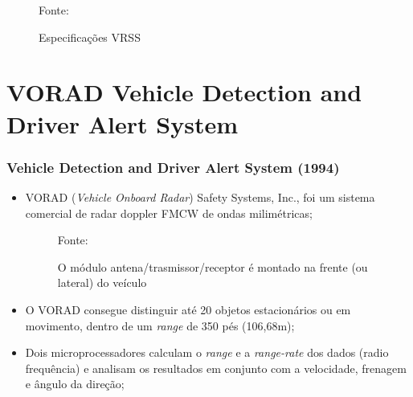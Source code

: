 \documentclass[xcolor=dvipsnames, aspectratio=169]{beamer}
\begin{document}
\begin{frame}
\begin{itemize}
\begin{figure}
            {Fonte: \cite{everett1995sensors}}
            \caption{Especificações VRSS}
            \label{fig:curva_de_freq}
        \end{figure}
	\end{itemize}
\end{frame}


\section[VORAD Vehicle Detection and Driver Alert System]{VORAD Vehicle Detection and Driver Alert System} 

\begin{frame}
\frametitle{Vehicle Detection and Driver Alert System (1994)}
	\begin{itemize}
		\item VORAD (\textit{Vehicle Onboard Radar}) Safety Systems, Inc., foi um sistema comercial de radar doppler FMCW de ondas milimétricas;
        \begin{figure}
            \centering
            {Fonte: \cite{everett1995sensors}}
            \caption{O módulo antena/trasmissor/receptor é montado na frente (ou lateral) do veículo}
            \label{fig:curva_de_freq}
        \end{figure}
		\item O VORAD consegue distinguir até 20 objetos estacionários ou em movimento, dentro de um \textit{range} de 350 pés (106,68m);
		\item Dois microprocessadores calculam o \textit{range} e a \textit{range-rate} dos dados (radio frequência) e analisam os resultados em conjunto com a velocidade, frenagem e ângulo da direção;

\end{itemize}
\end{frame}
\end{document}
